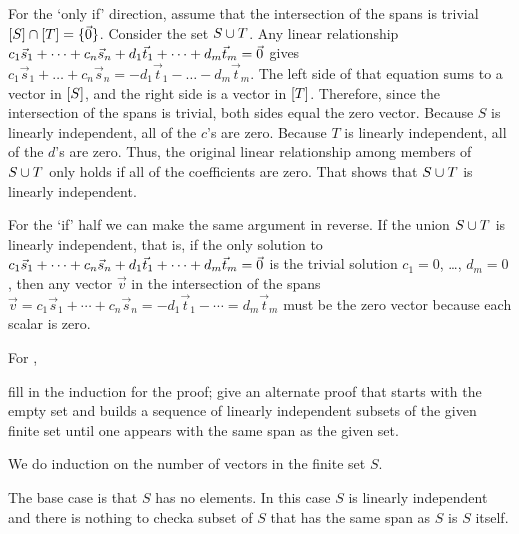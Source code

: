 \begin{exercises}
\begin{answer}
\begin{exparts}
          For the `only if' direction, assume that the intersection of
          the spans is trivial 
          \( \relax [S\relax ]\cap \relax [T\relax ]=\mbox{$\{\vec{0}\}$} \).
          Consider the set $S\cup T$.
          Any linear relationship 
          $c_1\vec{s}_1+\dots+c_n\vec{s}_n
            +d_1\vec{t}_1+\dots+d_m\vec{t}_m=\vec{0}$
          gives
          $c_1\vec{s}_1+\dots+c_n\vec{s}_n=
            -d_1\vec{t}_1-\dots-d_m\vec{t}_m$.
          The left side of that equation sums to a vector in $\relax [S\relax ]$, and
          the right side is a vector in $\relax [T\relax ]$.
          Therefore, since the intersection of the spans is trivial, both
          sides equal the zero vector.
          Because $S$ is linearly independent, all of the $c$'s are zero.
          Because $T$ is linearly independent, all of the $d$'s are zero.
          Thus, the original linear relationship among members of 
          $S\cup T$ only holds if all of the coefficients are zero.
          That shows that $S\cup T$ is linearly independent.

          For the `if' half we can make the same argument in reverse.
          If the union $S\cup T$ is linearly independent, that is, 
          if the only solution to          
          $c_1\vec{s}_1+\cdots+c_n\vec{s}_n
            +d_1\vec{t}_1+\cdots+d_m\vec{t}_m
            =\vec{0}$
          is the trivial solution $c_1=0$, \ldots, $d_m=0$, 
          then any vector $\vec{v}$ in the intersection of the spans
          $\vec{v}=c_1\vec{s}_1+\cdots+c_n\vec{s}_n
            =-d_1\vec{t}_1-\cdots=d_m\vec{t}_m$
          must be the zero vector because each scalar is zero.
      \end{exparts}  
    \end{answer}
  \recommended \item \label{exer:FillIndDetProofSetHasLISub}
    For ,
    \begin{exparts}
       \partsitem fill in the induction for the proof;
       \partsitem give an alternate proof that starts with the empty
         set and builds
         a sequence of linearly independent subsets of the given finite set
         until one appears with the same span as the given set.
    \end{exparts}
    \begin{answer}
      \begin{exparts}
         \partsitem We do induction on the number of vectors in the finite set
           \( S \).

           The base case is that $S$ has no elements.
           In this case $S$ is linearly independent and there is nothing to 
           check\Dash a subset of $S$ that has the same span as $S$ is $S$
           itself.


\end{exparts}
\end{answer}
\end{exercises}
